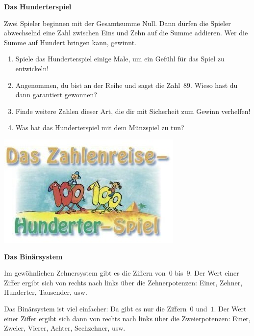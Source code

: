 \documentclass[a4paper,ngerman,14pt]{scrartcl}
\newcommand{\header}[1]{\begin{center}
  \Huge\textbf{\textsf{#1}}
\end{center}}
\begin{document}
\header{Das Hunderterspiel}

Zwei Spieler beginnen mit der Gesamtsumme Null. Dann
dürfen die Spieler abwechselnd eine Zahl zwischen Eins und Zehn auf die Summe
addieren. Wer die Summe auf Hundert bringen kann, gewinnt.

\begin{enumerate}
\item Spiele das Hunderterspiel einige Male, um ein Gefühl für das Spiel zu
entwickeln!
\item Angenommen, du bist an der Reihe und sagst die Zahl~$89$. Wieso
hast du dann garantiert gewonnen?
\item Finde weitere Zahlen dieser Art, die dir mit Sicherheit zum Gewinn
verhelfen!
\item Was hat das Hunderterspiel mit dem Münzspiel zu tun?
\end{enumerate}

\begin{center}
\includegraphics[scale=0.8]{hunderterspiel}
\end{center}

\newpage

\header{Das Binärsystem}

Im gewöhnlichen Zehnersystem gibt es die Ziffern von~$0$ bis~$9$. Der Wert 
einer Ziffer ergibt sich von rechts nach links über die Zehnerpotenzen: Einer,
Zehner, Hunderter, Tausender, usw.

Das Binärsystem ist viel einfacher: Da gibt
es nur die Ziffern~$0$ und~$1$. Der Wert einer Ziffer ergibt sich dann von
rechts nach links über die Zweierpotenzen: Einer, Zweier, Vierer, Achter,
Sechzehner, usw.
\end{document}
